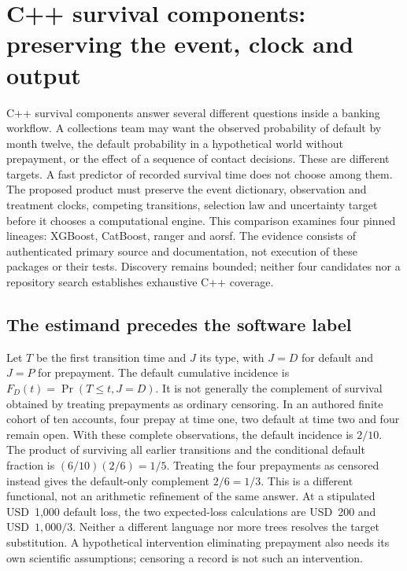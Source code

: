 \section{C++ survival components: preserving the event, clock and output}
\label{sec:exec24-longitudinal-cxx}

C++ survival components answer several different questions inside a banking
workflow. A collections team may want the observed probability of default by
month twelve, the default probability in a hypothetical world without prepayment,
or the effect of a sequence of contact decisions. These are different targets.
A fast predictor of recorded survival time does not choose among them. The
proposed product must preserve the event dictionary, observation and treatment
clocks, competing transitions, selection law and uncertainty target before it
chooses a computational engine. This comparison examines four pinned lineages:
XGBoost, CatBoost, ranger and aorsf. The evidence consists of authenticated primary
source and documentation, not execution of these packages or their tests.
Discovery remains bounded; neither four candidates nor a repository search
establishes exhaustive C++ coverage.\citep{exec24_longcxx_xgboost,exec24_longcxx_catboost,exec24_longcxx_ranger,exec24_longcxx_aorsf}

\subsection{The estimand precedes the software label}

Let $T$ be the first transition time and $J$ its type, with $J=D$ for default
and $J=P$ for prepayment. The default cumulative incidence is
$F_D(t)=\Pr(T\leq t,J=D)$. It is not generally the complement of survival
obtained by treating prepayments as ordinary censoring. In an authored finite
cohort of ten accounts, four prepay at time one, two default at time two and
four remain open. With these complete observations, the default incidence is
$2/10$. The product of surviving all earlier transitions and the conditional
default fraction is $(6/10)(2/6)=1/5$. Treating the four prepayments as censored
instead gives the default-only complement $2/6=1/3$. This is a different
functional, not an arithmetic refinement of the same answer. At a stipulated
USD~1,000 default loss, the two expected-loss calculations are USD~200 and
USD~$1{,}000/3$. Neither a different language nor more trees resolves the
target substitution. A hypothetical intervention eliminating prepayment also
needs its own scientific assumptions; censoring a record is not such an
intervention.\citep{exec24_longcxx_reference}

